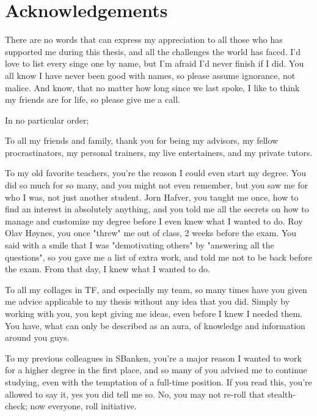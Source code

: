 \documentclass[a4paper]{article}
\begin{document}
%
%


%
%
\section*{Acknowledgements}
There are no words that can express my appreciation to all those who has supported me during this thesis,
and all the challenges the world has faced. I'd love to list every singe one by name, but I'm afraid I'd never
finish if I did. You all know I have never been good with names, so please assume ignorance, not malice. And
know, that no matter how long since we last spoke, I like to think my friends are for life, so please give me 
a call.

\hfill

In no particular order;

To all my friends and family, thank you for being my advisors, my fellow procrastinators, my personal trainers, 
my live entertainers, and my private tutors.

To my old favorite teachers, you're the reason I could even start my degree. You did so much for so many, and 
you might not even remember, but you saw me for who I was, not just another student. Jorn Hafver, you taught 
me once, how to find an interest in absolutely anything, and you told me all the secrets on how to manage and 
customize my degree before I even knew what I wanted to do. Roy Olav Høynes, you once "threw" me out of class, 
2 weeks before the exam. You said with a smile that I was "demotivating others" by "answering all the questions", 
so you gave me a list of extra work, and told me not to be back before the exam. From that day, I knew what 
I wanted to do.

To all my collages in TF, and especially my team, so many times have you given me advice applicable to my 
thesis without any idea that you did. Simply by working with you, you kept giving me ideas, 
even before I knew I needed them. You have, what can only be described as an aura, of knowledge and information around you guys.

To my previous colleagues in SBanken, you're a major reason I wanted to work for a higher degree in the first place,
and so many of you advised me to continue studying, even with the temptation of a full-time position. 
If you read this, you're allowed to say it, yes you did tell me so. No, you may not re-roll that stealth-check; 
now everyone, roll initiative.
\end{document}
